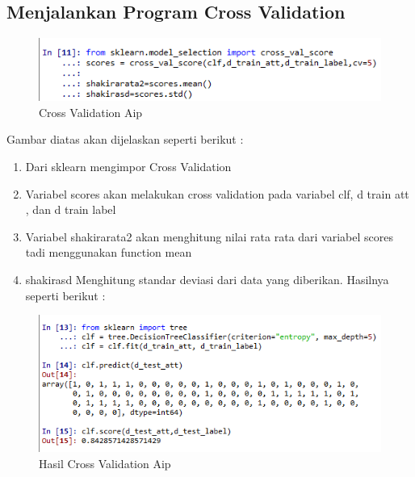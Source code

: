 \subsection{ Menjalankan Program Cross Validation}
\begin{figure}[ht]
\centering
\includegraphics[scale=0.5]{figures/AIP/c5.PNG}
\caption{Cross Validation Aip}
\label{Aplikasi Pandas}
\end{figure}
Gambar diatas akan dijelaskan seperti berikut :
\begin{enumerate}
\item Dari sklearn mengimpor Cross Validation
\item Variabel scores akan melakukan cross validation pada variabel clf, d train att , dan d train label
\item Variabel shakirarata2 akan menghitung nilai rata rata dari variabel scores tadi menggunakan function mean
\item shakirasd Menghitung standar deviasi dari data yang diberikan. Hasilnya seperti berikut :
\end{enumerate}
\begin{figure}[ht]
\centering
\includegraphics[scale=0.5]{figures/AIP/c6.PNG}
\caption{Hasil Cross Validation Aip}
\label{Cross Validation}
\end{figure}

